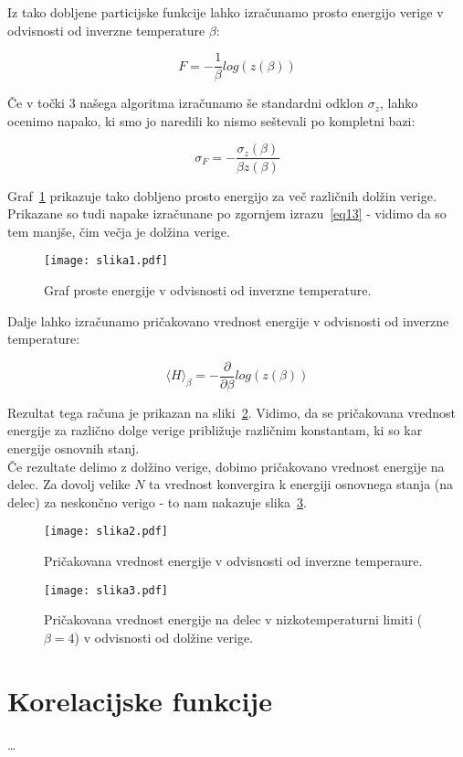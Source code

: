 \documentclass[a4paper]{article}
\newcommand{\pder}[2]{\frac{\partial#1}{\partial#2}}
\begin{document}
    Iz tako dobljene particijske funkcije lahko izračunamo prosto energijo verige v odvisnosti od inverzne temperature
    $\beta$:

    \begin{equation}\label{eq12}
        F = -\frac{1}{\beta}log(z(\beta))
    \end{equation}

    Če v točki $3$ našega algoritma izračunamo še standardni odklon $\sigma_z$, lahko ocenimo napako, ki smo jo naredili
    ko nismo seštevali po kompletni bazi:

    \begin{equation}\label{eq13}
    \sigma_F = -\frac{\sigma_z(\beta)}{\beta z(\beta)}
    \end{equation}

    Graf~\ref{slika1} prikazuje tako dobljeno prosto energijo za več različnih dolžin verige.
    Prikazane so tudi napake izračunane po zgornjem izrazu~\ref{eq13} - vidimo da so tem manjše, čim večja je dolžina
    verige.

    \begin{figure}
        \centering
        \texttt{[image: slika1.pdf]}
        \caption{Graf proste energije v odvisnosti od inverzne temperature.}
        \label{slika1}
    \end{figure}

    Dalje lahko izračunamo pričakovano vrednost energije v odvisnosti od inverzne temperature:

    \begin{equation}\label{eq14}
        \langle H \rangle_\beta = -\pder{}{\beta} log(z(\beta))
    \end{equation}

    Rezultat tega računa je prikazan na sliki~\ref{slika2}.
    Vidimo, da se pričakovana vrednost energije za različno dolge verige približuje različnim konstantam, ki so kar
    energije osnovnih stanj.\\

    Če rezultate delimo z dolžino verige, dobimo pričakovano vrednost energije na delec.
    Za dovolj velike $N$ ta vrednost konvergira k energiji osnovnega stanja (na delec) za neskončno verigo - to nam
    nakazuje slika~\ref{slika3}.

    \begin{figure}
        \centering
        \texttt{[image: slika2.pdf]}
        \caption{Pričakovana vrednost energije v odvisnosti od inverzne temperaure.}
        \label{slika2}
    \end{figure}

    \begin{figure}
        \centering
        \texttt{[image: slika3.pdf]}
        \caption{Pričakovana vrednost energije na delec v nizkotemperaturni limiti ($\beta = 4$) v odvisnosti od
        dolžine verige.}
        \label{slika3}
    \end{figure}

    \section{Korelacijske funkcije}

    \ldots
\end{document}
